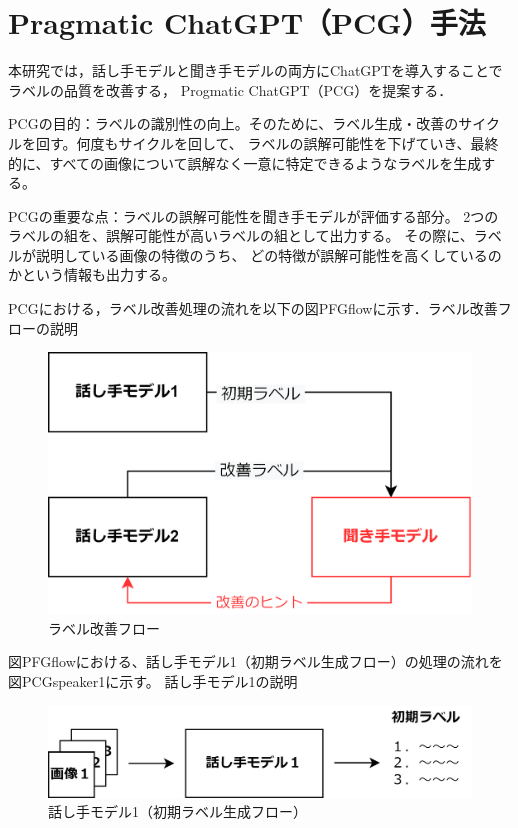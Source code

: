 \documentclass[a4paper,11pt]{jreport}
\begin{document}
\section{Pragmatic ChatGPT（PCG）手法}
本研究では，話し手モデルと聞き手モデルの両方にChatGPTを導入することでラベルの品質を改善する，
Progmatic ChatGPT（PCG）を提案する．

PCGの目的：ラベルの識別性の向上。そのために、ラベル生成・改善のサイクルを回す。何度もサイクルを回して、
ラベルの誤解可能性を下げていき、最終的に、すべての画像について誤解なく一意に特定できるようなラベルを生成する。

PCGの重要な点：ラベルの誤解可能性を聞き手モデルが評価する部分。
2つのラベルの組を、誤解可能性が高いラベルの組として出力する。
その際に、ラベルが説明している画像の特徴のうち、
どの特徴が誤解可能性を高くしているのかという情報も出力する。

PCGにおける，ラベル改善処理の流れを以下の図PFGflowに示す．ラベル改善フローの説明

\begin{figure}[H]
	\centering
	\includegraphics[width=0.8\linewidth]{figures/PCGflow.png}
	\caption{ラベル改善フロー}
	\label{fig:PCGflow}
\end{figure}

図PFGflowにおける、話し手モデル1（初期ラベル生成フロー）の処理の流れを図PCGspeaker1に示す。
話し手モデル1の説明

\begin{figure}[H]
	\centering
	\includegraphics[width=0.8\linewidth]{figures/PCGspeaker1.png}
	\caption{話し手モデル1（初期ラベル生成フロー）}
	\label{fig:PCGspeaker1}
\end{figure}
\end{document}
